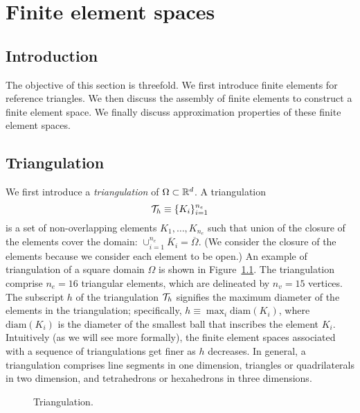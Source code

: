 \chapter{Finite element spaces}

\disclaimer

\section{Introduction}
The objective of this section is threefold.  We first introduce finite elements for reference triangles. We then discuss the assembly of finite elements to construct a finite element space.  We finally discuss approximation properties of these finite element spaces.

\section{Triangulation}
We first introduce a \emph{triangulation} of $\Omega \subset \mathbb{R}^d$.  A triangulation
\begin{equation*}
  \mathcal{T}_h \equiv \{ K_i \}_{i=1}^{n_e}
\end{equation*}
is a set of non-overlapping elements $K_1, \dots, K_{n_e}$ such that union of the closure of the elements cover the domain: $\cup_{i=1}^{n_e} \overline K_i = \overline \Omega$.   (We consider the closure of the elements because we consider each element to be open.) An example of triangulation of a square domain $\Omega$ is shown in Figure~\ref{fig:fe_mesh_p1}. The triangulation comprise $n_e = 16$ triangular elements, which are delineated by $n_v = 15$ vertices.  The subscript $h$ of the triangulation $\mathcal{T}_h$ signifies the maximum diameter of the elements in the triangulation; specifically, $h \equiv \max_{i} \text{diam}(K_i)$, where $\text{diam}(K_i)$ is the diameter of the smallest ball that inscribes the element $K_i$.  Intuitively (as we will see more formally), the finite element spaces associated with a sequence of triangulations get finer as $h$ decreases.  In general, a triangulation comprises line segments in one dimension, triangles or quadrilaterals in two dimension, and tetrahedrons or hexahedrons in three dimensions.


\begin{figure}
  \centering
  \caption{Triangulation.}
  \label{fig:fe_mesh_p1}
\end{figure}

